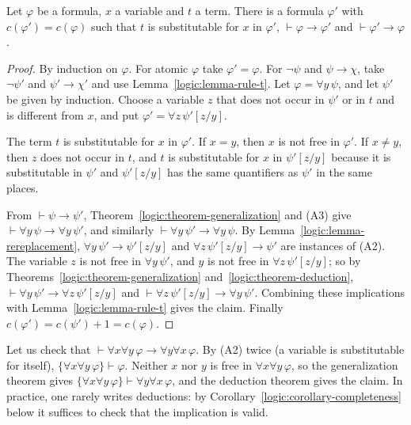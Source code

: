 \begin{lemma}\label{logic:lemma-alphabetic-variants}
Let $\varphi$ be a formula, $x$ a variable and $t$ a term. There is a formula
$\varphi'$ with $c(\varphi') = c(\varphi)$ such that $t$ is substitutable for
$x$ in $\varphi'$, $\vdash \varphi \to \varphi'$ and $\vdash \varphi' \to \varphi$.
\end{lemma}

\begin{proof}
By induction on $\varphi$. For atomic $\varphi$ take $\varphi' = \varphi$. For
$\neg\psi$ and $\psi \to \chi$, take $\neg\psi'$ and $\psi' \to \chi'$ and use
Lemma~\ref{logic:lemma-rule-t}. Let $\varphi = \forall y\,\psi$, and let
$\psi'$ be given by induction. Choose a variable $z$ that does not occur in
$\psi'$ or in $t$ and is different from $x$, and put
$\varphi' = \forall z\,\psi'[z/y]$.

The term $t$ is substitutable for $x$ in $\varphi'$. If $x = y$, then $x$ is
not free in $\varphi'$. If $x \neq y$, then $z$ does not occur in $t$, and $t$
is substitutable for $x$ in $\psi'[z/y]$ because it is substitutable in
$\psi'$ and $\psi'[z/y]$ has the same quantifiers as $\psi'$ in the same
places.

From $\vdash \psi \to \psi'$, Theorem~\ref{logic:theorem-generalization} and
(A3) give $\vdash \forall y\,\psi \to \forall y\,\psi'$, and similarly
$\vdash \forall y\,\psi' \to \forall y\,\psi$. By
Lemma~\ref{logic:lemma-rereplacement}, $\forall y\,\psi' \to \psi'[z/y]$ and
$\forall z\,\psi'[z/y] \to \psi'$ are instances of (A2). The variable $z$ is not
free in $\forall y\,\psi'$, and $y$ is not free in $\forall z\,\psi'[z/y]$; so
by Theorems~\ref{logic:theorem-generalization} and~\ref{logic:theorem-deduction},
$\vdash \forall y\,\psi' \to \forall z\,\psi'[z/y]$ and
$\vdash \forall z\,\psi'[z/y] \to \forall y\,\psi'$. Combining these
implications with Lemma~\ref{logic:lemma-rule-t} gives the claim. Finally
$c(\varphi') = c(\psi') + 1 = c(\varphi)$.
\end{proof}

\begin{example}\label{logic:example-deduction}
Let us check that $\vdash \forall x \forall y\, \varphi \to \forall y \forall x\, \varphi$.
By (A2) twice (a variable is substitutable for itself),
$\{\forall x \forall y\, \varphi\} \vdash \varphi$. Neither $x$ nor $y$ is free
in $\forall x \forall y\, \varphi$, so the generalization theorem gives
$\{\forall x \forall y\, \varphi\} \vdash \forall y \forall x\, \varphi$, and the
deduction theorem gives the claim. In practice, one rarely writes deductions:
by Corollary~\ref{logic:corollary-completeness} below it suffices to check
that the implication is valid.
\end{example}

